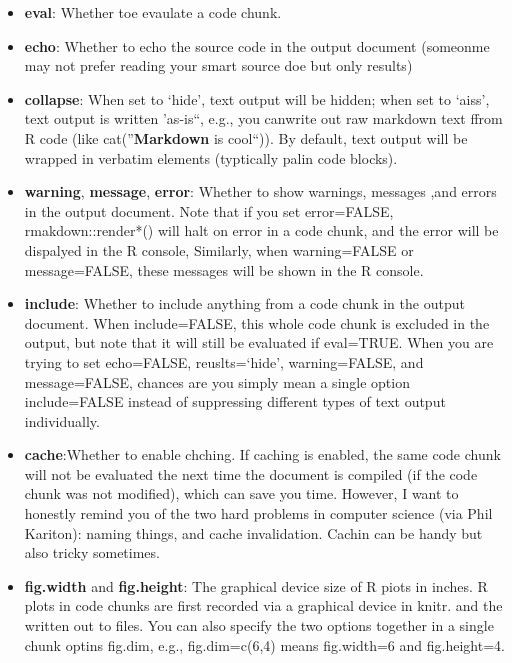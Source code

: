 \documentclass[]{article}
\providecommand{\tightlist}{%
  \setlength{\itemsep}{0pt}\setlength{\parskip}{0pt}}
\begin{document}
\begin{itemize}
\tightlist
\item
  \textbf{eval}: Whether toe evaulate a code chunk.\\
\item
  \textbf{echo}: Whether to echo the source code in the output document
  (someonme may not prefer reading your smart source doe but only
  results)\\
\item
  \textbf{collapse}: When set to `hide', text output will be hidden;
  when set to `aiss', text output is written 'as-is``, e.g., you
  canwrite out raw markdown text ffrom R code (like
  cat(''\textbf{Markdown} is cool``)). By default, text output will be
  wrapped in verbatim elements (typtically palin code blocks).\\
\item
  \textbf{warning}, \textbf{message}, \textbf{error}: Whether to show
  warnings, messages ,and errors in the output document. Note that if
  you set error=FALSE, rmakdown::render*() will halt on error in a code
  chunk, and the error will be dispalyed in the R console, Similarly,
  when warning=FALSE or message=FALSE, these messages will be shown in
  the R console.\\
\item
  \textbf{include}: Whether to include anything from a code chunk in the
  output document. When include=FALSE, this whole code chunk is excluded
  in the output, but note that it will still be evaluated if eval=TRUE.
  When you are trying to set echo=FALSE, reuslts=`hide', warning=FALSE,
  and message=FALSE, chances are you simply mean a single option
  include=FALSE instead of suppressing different types of text output
  individually.\\
\item
  \textbf{cache}:Whether to enable chching. If caching is enabled, the
  same code chunk will not be evaluated the next time the document is
  compiled (if the code chunk was not modified), which can save you
  time. However, I want to honestly remind you of the two hard problems
  in computer science (via Phil Kariton): naming things, and cache
  invalidation. Cachin can be handy but also tricky sometimes.\\
\item
  \textbf{fig.width} and \textbf{fig.height}: The graphical device size
  of R piots in inches. R plots in code chunks are first recorded via a
  graphical device in knitr. and the written out to files. You can also
  specify the two options together in a single chunk optins fig.dim,
  e.g., fig.dim=c(6,4) means fig.width=6 and fig.height=4.
\end{itemize}
\end{document}
